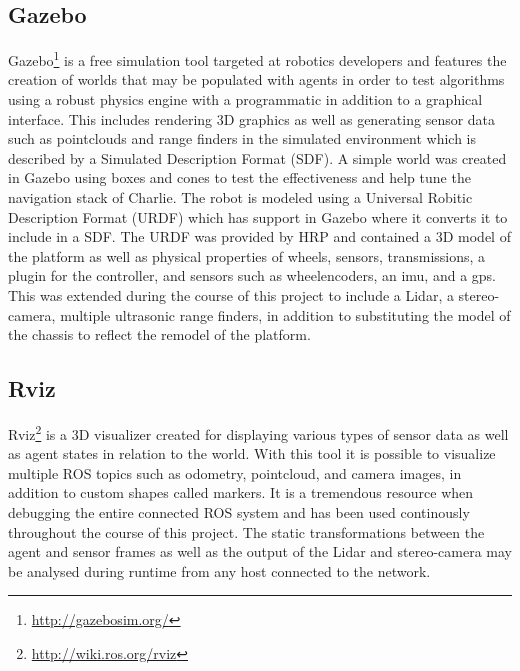 \subsection{Gazebo}
Gazebo\footnote{\url{http://gazebosim.org/}} is a free simulation tool targeted at robotics developers and features the creation of worlds that may be populated with agents in order to test algorithms using a robust physics engine with a programmatic in addition to a graphical interface. This includes rendering 3D graphics as well as generating sensor data such as pointclouds and range finders in the simulated environment which is described by a Simulated Description Format (SDF). A simple world was created in Gazebo using boxes and cones to test the effectiveness and help tune the navigation stack of Charlie. The robot is modeled using a Universal Robitic Description Format (URDF) which has support in Gazebo where it converts it to include in a SDF. The URDF was provided by HRP and contained a 3D model of the platform as well as physical properties of wheels, sensors, transmissions, a plugin for the controller, and sensors such as wheelencoders, an imu, and a gps. This was extended during the course of this project to include a Lidar, a stereo-camera, multiple ultrasonic range finders, in addition to substituting the model of the chassis to reflect the remodel of the platform.  
\subsection{Rviz}
Rviz\footnote{\url{http://wiki.ros.org/rviz}} is a 3D visualizer created for displaying various types of sensor data as well as agent states in relation to the world. With this tool it is possible to visualize multiple ROS topics such as odometry, pointcloud, and camera images, in addition to custom shapes called markers. It is a tremendous resource when debugging the entire connected ROS system and has been used continously throughout the course of this project. The static transformations between the agent and sensor frames as well as the output of the Lidar and stereo-camera may be analysed during runtime from any host connected to the network. 


